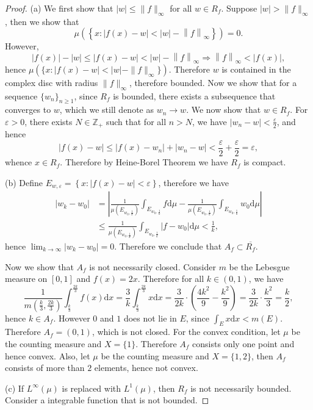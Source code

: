 \begin{proof}
(a) We first show that $|w|\le\|f\|_\infty$ for all $w\in R_f$. Suppose $|w|>\|f\|_\infty$, then we show that 
$$
\mu \left( \left\{ x:\left| f\left( x \right) -w \right|<\left| w \right|-\left\| f \right\| _{\infty} \right\} \right) =0.
$$
However, 
$$
\left| f\left( x \right) \right|-\left| w \right|\le \left| f\left( x \right) -w \right|<\left| w \right|-\left\| f \right\| _{\infty}\Rightarrow \left\| f \right\| _{\infty}<\left| f\left( x \right) \right|,
$$
hence $\mu(\{x:|f(x)-w|<|w|-\|f\|_\infty\})$. Therefore $w$ is contained in the complex disc with radius $\|f\|_\infty$, therefore bounded. Now we show that for a sequence $\{w_n\}_{n\ge 1}$, since $R_f$ is bounded, there exists a subsequence that converges to $w$, which we still denote as $w_n\to w$. We now show that $w\in R_f$. For $\varepsilon>0$, there exists $N\in\mathbb{Z}_+$ such that for all $n>N$, we have $|w_n-w|<\frac{\varepsilon}{2}$, and hence 
$$
\left| f\left( x \right) -w \right|\le \left| f\left( x \right) -w_n \right|+\left| w_n-w \right|<\frac{\varepsilon}{2}+\frac{\varepsilon}{2}=\varepsilon ,
$$
whence $x\in R_f$. Therefore by Heine-Borel Theorem we have $R_f$ is compact.\par
(b) Define $E_{w,\varepsilon}=\left\{ x:\left| f\left( x \right) -w \right|<\varepsilon \right\} $, therefore we have 
$$
\begin{aligned}
\left| w_k-w_0 \right|&=\left| \frac{1}{\mu \left( E_{w_0,\frac{1}{k}} \right)}\int_{E_{w_0,\frac{1}{k}}}{f\mathrm{d}\mu}-\frac{1}{\mu \left( E_{w_0,\frac{1}{k}} \right)}\int_{E_{w_0,\frac{1}{k}}}{w_0\mathrm{d}\mu} \right|
\\
&\le \frac{1}{\mu \left( E_{w_0,\frac{1}{k}} \right)}\int_{E_{w_0,\frac{1}{k}}}{\left| f-w_0 \right|\mathrm{d}\mu}<\frac{1}{k},
\end{aligned}
$$
hence $\lim_{k\to\infty}|w_k-w_0|=0$. Therefore we conclude that $A_f\subset\overline{R_f}$.\par
Now we show that $A_f$ is not necessarily closed. Consider $m$ be the Lebesgue measure on $[0,1]$ and $f(x)=2x$. Therefore for all $k\in (0,1)$, we have 
$$
\frac{1}{m\left( \frac{k}{3},\frac{2k}{3} \right)}\int_{\frac{k}{3}}^{\frac{2k}{3}}{f\left( x \right) \mathrm{d}x}=\frac{3}{k}\int_{\frac{k}{3}}^{\frac{2k}{3}}{x\mathrm{d}x}=\frac{3}{2k}\cdot \left( \frac{4k^2}{9}-\frac{k^2}{9} \right) =\frac{3}{2k}\cdot \frac{k^2}{3}=\frac{k}{2},
$$
hence $k\in A_f$. However $0$ and $1$ does not lie in $E$, since $\int_E{x\mathrm{d}x}<m\left( E \right) $. Therefore $A_f=(0,1)$, which is not closed. For the convex condition, let $\mu$ be the counting measure and $X=\{1\}$. Therefore $A_f$ consists only one point and hence convex. Also, let $\mu$ be the counting measure and $X=\{1,2\}$, then $A_f$ consists of more than $2$ elements, hence not convex.\par
(c) If $L^\infty(\mu)$ is replaced with $L^1(\mu)$, then $R_f$ is not necessarily bounded. Consider a integrable function that is not bounded.
\end{proof}
